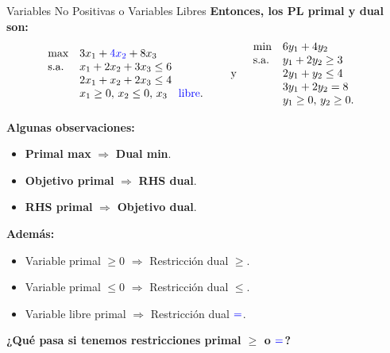 \documentclass{beamer}
\begin{document}
\begin{frame}{Variables No Positivas o Variables Libres}
    \textbf{Entonces, los PL primal y dual son:}
    \[
    \begin{array}{lll}
    \text{max} & 3x_1 + \textcolor{blue}{4x_2} + 8x_3 & \\
    \text{s.a.} & x_1 + 2x_2 + 3x_3 \leq 6 & \\
    & 2x_1 + x_2 + 2x_3 \leq 4 & \\
    & x_1 \geq 0, \, x_2 \leq 0, \, x_3 \quad \text{\textcolor{blue}{libre}}. &
    \end{array}
    \quad \text{y} \quad
    \begin{array}{lll}
    \text{min} & 6y_1 + 4y_2 & \\
    \text{s.a.} & y_1 + 2y_2 \geq 3 & \\
    & 2y_1 + y_2 \leq 4 & \\
    & 3y_1 + 2y_2 = 8 & \\
    & y_1 \geq 0, \, y_2 \geq 0. &
    \end{array}
    \]

    \vspace{0.3cm}
    \textbf{Algunas observaciones:}
    \begin{itemize}
        \item \textbf{Primal max} \(\Rightarrow\) \textbf{Dual min}.
        \item \textbf{Objetivo primal} \(\Rightarrow\) \textbf{RHS dual}.
        \item \textbf{RHS primal} \(\Rightarrow\) \textbf{Objetivo dual}.
    \end{itemize}

    \vspace{0.3cm}
    \textbf{Además:}
    \begin{itemize}
        \item Variable primal \(\geq 0\) \(\Rightarrow\) Restricción dual \(\geq\).
        \item Variable primal \(\leq 0\) \(\Rightarrow\) Restricción dual \(\leq\).
        \item Variable libre primal \(\Rightarrow\) Restricción dual \(\textcolor{blue}{=}\).
    \end{itemize}

    \vspace{0.3cm}
    \textbf{¿Qué pasa si tenemos restricciones primal \(\geq\) o \(\textcolor{blue}{=}\)?}
\end{frame}
\end{document}
